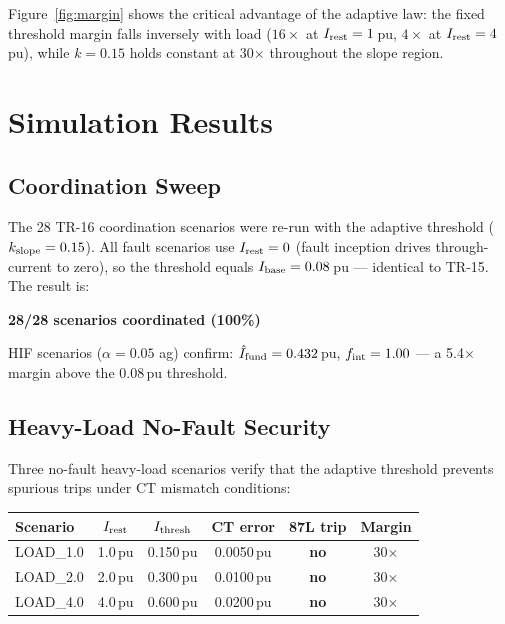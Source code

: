 \documentclass[11pt, a4paper]{article}
\begin{document}
Figure~\ref{fig:margin} shows the critical advantage of the adaptive law:
the fixed threshold margin falls inversely with load ($16\times$ at
$I_{\rm rest}=1$\,pu, $4\times$ at $I_{\rm rest}=4$\,pu), while
$k=0.15$ holds constant at 30$\times$ throughout the slope region.


\section{Simulation Results}
\label{sec:results}

\subsection{Coordination Sweep}

The 28 TR-16 coordination scenarios were re-run with the adaptive threshold
($k_{\rm slope}=0.15$).  All fault scenarios use $I_{\rm rest}=0$ (fault
inception drives through-current to zero), so the threshold equals $I_{\rm base}=0.08$\,pu
--- identical to TR-15.  The result is:

\begin{center}
\Large
\textbf{\textcolor{okgreen}{28/28 scenarios coordinated (100\%)}}
\end{center}

HIF scenarios ($\alpha=0.05$ ag) confirm:
$\hat{I}_{\rm fund} = 0.432$\,pu, $f_{\rm int}=1.00$ --- a 5.4$\times$ margin
above the 0.08\,pu threshold.

\subsection{Heavy-Load No-Fault Security}

Three no-fault heavy-load scenarios verify that the adaptive threshold
prevents spurious trips under CT mismatch conditions:

\begin{center}
\begin{tabular}{lccccc}
  \toprule
  Scenario & $I_{\rm rest}$ & $I_{\rm thresh}$ & CT error & 87L trip & Margin \\
  \midrule
  LOAD\_1.0 & 1.0\,pu & 0.150\,pu & 0.0050\,pu & \textbf{no} & 30$\times$ \\
  LOAD\_2.0 & 2.0\,pu & 0.300\,pu & 0.0100\,pu & \textbf{no} & 30$\times$ \\
  LOAD\_4.0 & 4.0\,pu & 0.600\,pu & 0.0200\,pu & \textbf{no} & 30$\times$ \\
  \bottomrule
\end{tabular}
\end{center}
\end{document}
